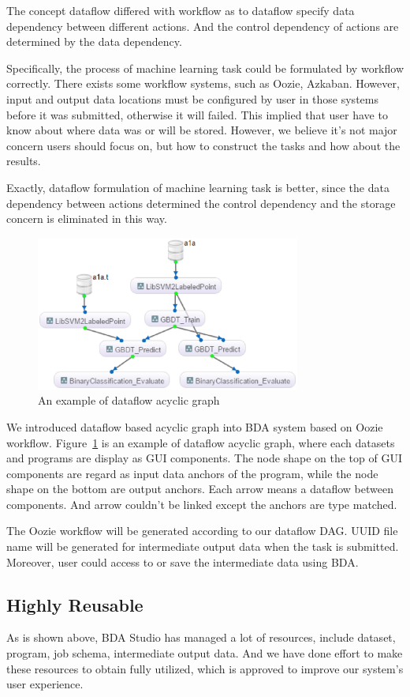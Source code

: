 \documentclass{sig-alternate-05-2015}
\begin{document}
The concept dataflow differed with workflow as to dataflow specify data dependency between different actions. And the control dependency of actions are determined by the data dependency.

Specifically, the process of machine learning task could be formulated by workflow correctly. There exists some workflow systems, such as Oozie, Azkaban. However, input and output data locations must be configured by user in those systems before it was submitted, otherwise it will failed. This implied that user have to know about where data was or will be stored. However, we believe it's not major concern users should focus on, but how to construct the tasks and how about the results. 

Exactly, dataflow formulation of machine learning task is better, since the data dependency between actions determined the control dependency and the storage concern is eliminated in this way. 

\begin{figure}[!htb]
\centering
\includegraphics[height=2in]{DAG.eps}
\caption{An example of dataflow acyclic graph}
\label{fig:dag}
\end{figure}

We introduced dataflow based acyclic graph into BDA system based on Oozie workflow. Figure~\ref{fig:dag} is an example of dataflow acyclic graph, where each datasets and programs are display as GUI components. The node shape on the top of GUI components are regard as input data anchors of the program, while the node shape on the bottom are output anchors. Each arrow means a dataflow between components. And arrow couldn't be linked except the anchors are type matched.

The Oozie workflow will be generated according to our dataflow DAG. UUID file name will be generated for intermediate output data when the task is submitted. Moreover, user could access to or save the intermediate data using BDA.

\subsection{Highly Reusable}
As is shown above, BDA Studio has managed a lot of resources, include dataset, program, job schema, intermediate output data. And we have done effort to make these resources to obtain fully utilized, which is approved to improve our system's user experience.
\end{document}
